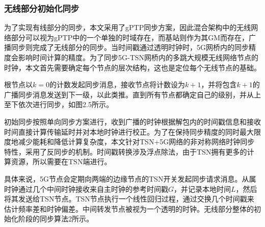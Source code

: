 \documentclass[UTF8,a4paper,12pt]{ctexart}
\numberwithin{equation}{section}
\begin{document}
	\subsubsection{无线部分初始化同步}
	为了实现有线部分的同步，本文采用了gPTP同步方案，因此混合架构中的无线网络部分可以视为gPTP中的一个单独的时域存在，而基站则作为其GM而存在，广播同步则完成了无线部分的同步。当时间戳通过透明时钟时，5G网桥内的同步精度会影响时间计算的精度。为了同步5G-TSN网桥内的多跳大规模无线网络节点的时钟，本文首先需要确定每个节点的层次结构，这也是定位每个无线节点的基础。
	
	根节点以$k=0$的计数发起同步消息，接收节点将计数设为$k+1$，并将包含$k+1$的广播同步消息发送到下一级，以此类推。直到所有节点都确定自己的级别，并从上至下依次进行同步，如图2.5所示。
	
	初始同步按照单向同步方案进行，收到广播的时钟根据解包内的时间戳信息和接收时间直接计算传输延时并对本地时钟进行校正。为了在保持同步精度的同时最大限度地减少能耗和降低计算复杂度，本文针对TSN+5G网络的非对称网络时钟同步特性，采用了反同步的机制\cite{8935413}。时间戳转换涉及浮点除法，由于TSN拥有更多的计算资源，所以需要在TSN端进行。
	
	具体来说，5G节点会定期向两端的边缘节点的TSN开关发起同步请求消息。从属时钟通过几个中间时钟接收来自主时钟的参考时间戳$G$，并记录本地时间$L$，然后将其发送给TSN节点。TSN节点执行一个线性回归过程，通过交换几个时间戳来估计频率差和时钟偏差。中间转发节点被视为一个透明的时钟。无线部分整体的初始化阶段的同步算法2所示。
	
\end{document}
